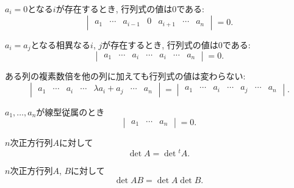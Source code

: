 \begin{bcor}\label{cor:gaussian}
$a_i=0$となる$i$が存在するとき, 行列式の値は$0$である:
\[\begin{vmatrix}a_1&\cdots&a_{i-1}&0&a_{i+1}&\cdots&a_n\end{vmatrix}=0.\]

$a_i=a_j$となる相異なる$i$, $j$が存在するとき, 行列式の値は$0$である:
\[\begin{vmatrix}a_1&\cdots&a_i&\cdots&a_i&\cdots&a_n\end{vmatrix}=0.\]

ある列の複素数倍を他の列に加えても行列式の値は変わらない:
\[\begin{vmatrix}a_1&\cdots&a_i&\cdots&\lambda a_i+a_j&\cdots&a_n\end{vmatrix}=\begin{vmatrix}a_1&\cdots&a_i&\cdots&a_j&\cdots&a_n\end{vmatrix}.\]
\end{bcor}
\begin{bprop}
$a_1,\ldots,a_n$が線型従属のとき
\[\begin{vmatrix}a_1&\cdots&a_n\end{vmatrix}=0.\]
\end{bprop}
\begin{bprop}
$n$次正方行列$A$に対して
\[\det A=\det{}^tA.\]
\end{bprop}
\begin{bprop}
$n$次正方行列$A$, $B$に対して
\[\det AB=\det A\det B.\]
\end{bprop}
%
